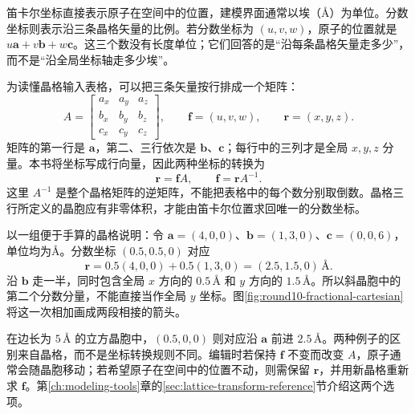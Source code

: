 笛卡尔坐标直接表示原子在空间中的位置，建模界面通常以埃（\AA）为单位。分数坐标则表示沿三条晶格矢量的比例。若分数坐标为 $(u,v,w)$，原子的位置就是 $u\mathbf a+v\mathbf b+w\mathbf c$。这三个数没有长度单位；它们回答的是“沿每条晶格矢量走多少”，而不是“沿全局坐标轴走多少埃”。

为读懂晶格输入表格，可以把三条矢量按行排成一个矩阵：
\[
 A=\begin{bmatrix}
 a_x&a_y&a_z\\
 b_x&b_y&b_z\\
 c_x&c_y&c_z
 \end{bmatrix},\qquad
 \mathbf f=(u,v,w),\qquad \mathbf r=(x,y,z).
\]
矩阵的第一行是 $\mathbf a$，第二、三行依次是 $\mathbf b$、$\mathbf c$；每行中的三列才是全局 $x,y,z$ 分量。本书将坐标写成行向量，因此两种坐标的转换为
\begin{equation}
 \mathbf r=\mathbf f A,\qquad \mathbf f=\mathbf r A^{-1}.
 \label{eq:row-lattice-coordinates}
\end{equation}
这里 $A^{-1}$ 是整个晶格矩阵的逆矩阵，不能把表格中的每个数分别取倒数。晶格三行所定义的晶胞应有非零体积，才能由笛卡尔位置求回唯一的分数坐标。

以一组便于手算的晶格说明：令 $\mathbf a=(4,0,0)$、$\mathbf b=(1,3,0)$、$\mathbf c=(0,0,6)$，单位均为\AA。分数坐标 $(0.5,0.5,0)$ 对应
\[
 \mathbf r=0.5(4,0,0)+0.5(1,3,0)
          =(2.5,1.5,0)\,\text{\AA}.
\]
沿 $\mathbf b$ 走一半，同时包含全局 $x$ 方向的 $0.5\,\text{\AA}$ 和 $y$ 方向的 $1.5\,\text{\AA}$。所以斜晶胞中的第二个分数分量，不能直接当作全局 $y$ 坐标。图\ref{fig:round10-fractional-cartesian}将这一次相加画成两段相接的箭头。



在边长为 $5\,\text{\AA}$ 的立方晶胞中，$(0.5,0,0)$ 则对应沿 $\mathbf a$ 前进 $2.5\,\text{\AA}$。两种例子的区别来自晶格，而不是坐标转换规则不同。编辑时若保持 $\mathbf f$ 不变而改变 $A$，原子通常会随晶胞移动；若希望原子在空间中的位置不动，则需保留 $\mathbf r$，并用新晶格重新求 $\mathbf f$。第\ref{ch:modeling-tools}章的\ref{sec:lattice-transform-reference}节介绍这两个选项。

